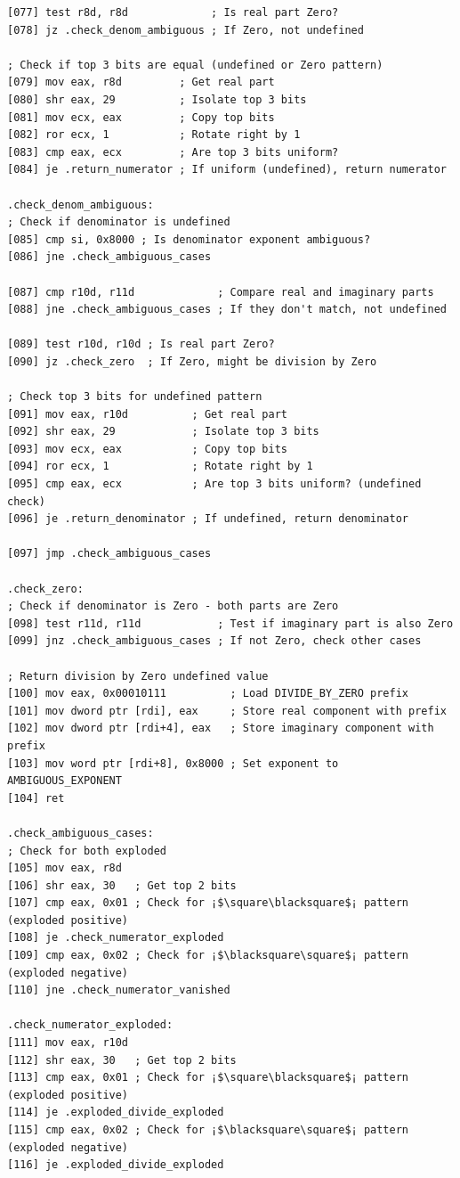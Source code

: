 \documentclass[12pt,letter]{article}
\begin{document}
\begin{lstlisting}[style=rust, caption={Complete Complex Division Assembly Implementation}, label={fig:circle_divide}]
[077] test r8d, r8d             ; Is real part Zero?
[078] jz .check_denom_ambiguous ; If Zero, not undefined

; Check if top 3 bits are equal (undefined or Zero pattern)
[079] mov eax, r8d         ; Get real part
[080] shr eax, 29          ; Isolate top 3 bits
[081] mov ecx, eax         ; Copy top bits
[082] ror ecx, 1           ; Rotate right by 1
[083] cmp eax, ecx         ; Are top 3 bits uniform?
[084] je .return_numerator ; If uniform (undefined), return numerator

.check_denom_ambiguous:
; Check if denominator is undefined
[085] cmp si, 0x8000 ; Is denominator exponent ambiguous?
[086] jne .check_ambiguous_cases

[087] cmp r10d, r11d             ; Compare real and imaginary parts
[088] jne .check_ambiguous_cases ; If they don't match, not undefined

[089] test r10d, r10d ; Is real part Zero?
[090] jz .check_zero  ; If Zero, might be division by Zero

; Check top 3 bits for undefined pattern
[091] mov eax, r10d          ; Get real part
[092] shr eax, 29            ; Isolate top 3 bits
[093] mov ecx, eax           ; Copy top bits
[094] ror ecx, 1             ; Rotate right by 1
[095] cmp eax, ecx           ; Are top 3 bits uniform? (undefined check)
[096] je .return_denominator ; If undefined, return denominator

[097] jmp .check_ambiguous_cases

.check_zero:
; Check if denominator is Zero - both parts are Zero
[098] test r11d, r11d            ; Test if imaginary part is also Zero
[099] jnz .check_ambiguous_cases ; If not Zero, check other cases

; Return division by Zero undefined value
[100] mov eax, 0x00010111          ; Load DIVIDE_BY_ZERO prefix
[101] mov dword ptr [rdi], eax     ; Store real component with prefix
[102] mov dword ptr [rdi+4], eax   ; Store imaginary component with prefix
[103] mov word ptr [rdi+8], 0x8000 ; Set exponent to AMBIGUOUS_EXPONENT
[104] ret

.check_ambiguous_cases:
; Check for both exploded
[105] mov eax, r8d
[106] shr eax, 30   ; Get top 2 bits
[107] cmp eax, 0x01 ; Check for ¡$\square\blacksquare$¡ pattern (exploded positive)
[108] je .check_numerator_exploded
[109] cmp eax, 0x02 ; Check for ¡$\blacksquare\square$¡ pattern (exploded negative)
[110] jne .check_numerator_vanished

.check_numerator_exploded:
[111] mov eax, r10d
[112] shr eax, 30   ; Get top 2 bits
[113] cmp eax, 0x01 ; Check for ¡$\square\blacksquare$¡ pattern (exploded positive)
[114] je .exploded_divide_exploded
[115] cmp eax, 0x02 ; Check for ¡$\blacksquare\square$¡ pattern (exploded negative)
[116] je .exploded_divide_exploded


\end{lstlisting}
\end{document}
